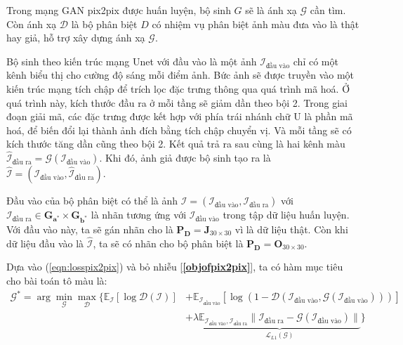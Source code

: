 \documentclass[a4paper, 12pt]{report}
\begin{document}
Trong mạng GAN pix2pix được huấn luyện, bộ sinh $G$ sẽ là ánh xạ $\mathcal{G}$ cần tìm.
Còn ánh xạ $\mathcal{D}$ là bộ phân biệt $D$ có nhiệm vụ phân biệt ảnh màu đưa vào là thật hay giả, hỗ trợ xây dựng ánh xạ $\mathcal{G}$.\vspace{5pt}

Bộ sinh theo kiến trúc mạng Unet với đầu vào là một ảnh $\mathcal{I}_{\text{đầu vào}}$ chỉ có một kênh biểu thị cho cường độ sáng mỗi điểm ảnh.
Bức ảnh sẽ được truyền vào một kiến trúc mạng tích chập để trích lọc đặc trưng thông qua quá trình mã hoá.
Ở quá trình này, kích thước đầu ra ở mỗi tầng sẽ giảm dần theo bội 2.
Trong giai đoạn giải mã, các đặc trưng được kết hợp với phía trái nhánh chữ U là phần mã hoá, để biến đổi lại thành ảnh đích bằng tích chập chuyển vị.
Và mỗi tầng sẽ có kích thước tăng dần cũng theo bội 2.
Kết quả trả ra sau cùng là hai kênh màu $\widehat{\mathcal{I}}_{\text{đầu ra}} = \mathcal{G}\left(\mathcal{I}_{\text{đầu vào}}\right)$.
Khi đó, ảnh giả được bộ sinh tạo ra là $\widehat{\mathcal{I}} = \left(\mathcal{I}_{\text{đầu vào}}, \widehat{\mathcal{I}}_{\text{đầu ra}}\right)$.\vspace{5pt}

Đầu vào của bộ phân biệt có thể là ảnh $\mathcal{I} = \left(\mathcal{I}_{\text{đầu vào}}, \mathcal{I}_{\text{đầu ra}}\right)$ với $\mathcal{I}_{\text{đầu ra}} \in \bm{G}_{\mathbf{a}^*} \times \bm{G}_{\mathbf{b}^*}$ là nhãn tương ứng với $\mathcal{I}_{\text{đầu vào}}$ trong tập dữ liệu huấn luyện.
Với đầu vào này, ta sẽ gán nhãn cho là $\mathbf{P_D} = \mathbf{J}_{30 \times 30}$ vì là dữ liệu thật.
Còn khi dữ liệu đầu vào là $\widehat{\mathcal{I}}$, ta sẽ có nhãn cho bộ phân biệt là $\mathbf{P_D} = \mathbf{O}_{30 \times 30}$.\vspace{5pt}

Dựa vào (\ref{eqn:losspix2pix}) và bỏ nhiễu [\textbf{\ref{objofpix2pix}}], ta có hàm mục tiêu cho bài toán tô màu là:
\begin{align}
    \mathcal{G}^* = \arg\min_{\mathcal{G}}\max_{\mathcal{D}}\bigl\{
    \mathbb{E}_{\mathcal{I}}\left[\log \mathcal{D}\left(\mathcal{I}\right)\right]
    &+ \mathbb{E}_{\mathcal{I}_{\text{đầu vào}}}\left[\log\left(1-\mathcal{D}\left(\mathcal{I}_{\text{đầu vào}}, \mathcal{G}\left(\mathcal{I}_{\text{đầu vào}}\right)\right)\right)\right] \nonumber\\
    &+ \lambda \underbrace{\mathbb{E}_{\mathcal{I}_{\text{đầu vào}}, \mathcal{I}_{\text{đầu ra}}}\lVert \mathcal{I}_{\text{đầu ra}} - \mathcal{G}\left(\mathcal{I}_{\text{đầu vào}}\right)\rVert}_{\mathcal{L}_{L1}\left(\mathcal{G}\right)}\bigr\}\label{eqn:lossofmainmodal}
\end{align}
\end{document}
